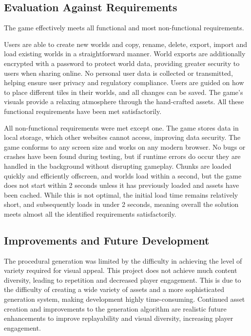 \documentclass[14pt]{article}
\begin{document}
\subsection{Evaluation Against Requirements}
The game effectively meets all functional and most non-functional requirements.

Users are able to create new worlds and copy, rename, delete, export, import and load existing worlds in a straightforward manner.
World exports are additionally encrypted with a password to protect world data, providing greater security to users when sharing online.
No personal user data is collected or transmitted, helping ensure user privacy and regulatory compliance.
Users are guided on how to place different tiles in their worlds, and all changes can be saved.
The game's visuals provide a relaxing atmosphere through the hand-crafted assets.
All these functional requirements have been met satisfactorily.

All non-functional requirements were met except one.
The game stores data in local storage, which other websites cannot access, improving data security.
The game conforms to any screen size and works on any modern browser.
No bugs or crashes have been found during testing, but if runtime errors do occur they are handled in the background without disrupting gameplay.
Chunks are loaded quickly and efficiently offscreen, and worlds load within a second, but the game does not start within 2 seconds unless it has previously loaded and assets have been cached.
While this is not optimal, the initial load time remains relatively short, and subsequently loads in under 2 seconds, meaning overall the solution meets almost all the identified requirements satisfactorily.

\subsection{Improvements and Future Development}
The procedural generation was limited by the difficulty in achieving the level of variety required for visual appeal.
This project does not achieve much content diversity, leading to repetition and decreased player engagement.
This is due to the difficulty of creating a wide variety of assets and a more sophisticated generation system, making development highly time-consuming.
Continued asset creation and improvements to the generation algorithm are realistic future enhancements to improve replayability and visual diversity, increasing player engagement.
\end{document}
